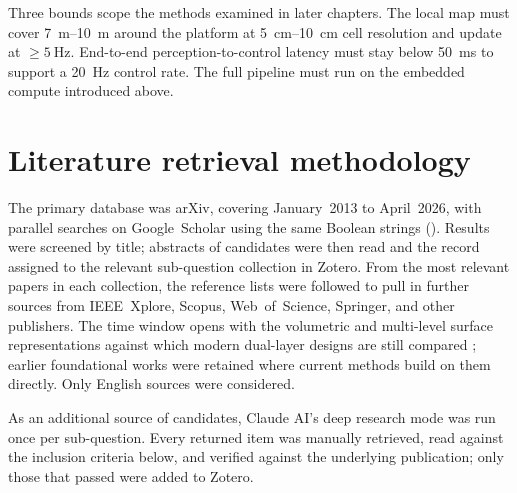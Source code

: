 \documentclass[11pt,a4paper]{article}
\begin{document}
Three bounds scope the methods examined in later chapters. The local map must cover \SIrange{7}{10}{\metre} around the platform at \SIrange{5}{10}{\centi\metre} cell resolution and update at $\geq\SI{5}{\hertz}$. End-to-end perception-to-control latency must stay below \SI{50}{\milli\second} to support a \SI{20}{\hertz} control rate. The full pipeline must run on the embedded compute introduced above.

\section{Literature retrieval methodology}
\label{sec:retrieval}

The primary database was arXiv, covering January~2013 to April~2026, with parallel searches on Google~Scholar using the same Boolean strings (). Results were screened by title; abstracts of candidates were then read and the record assigned to the relevant sub-question collection in Zotero. From the most relevant papers in each collection, the reference lists were followed to pull in further sources from IEEE~Xplore, Scopus, Web~of~Science, Springer, and other publishers. The time window opens with the volumetric and multi-level surface representations against which modern dual-layer designs are still compared \citep{OctoMapEfficientProbabilistic, MultiLevelSurfaceMaps}; earlier foundational works were retained where current methods build on them directly. Only English sources were considered.

As an additional source of candidates, Claude AI's deep research mode was run once per sub-question. Every returned item was manually retrieved, read against the inclusion criteria below, and verified against the underlying publication; only those that passed were added to Zotero.
\end{document}

